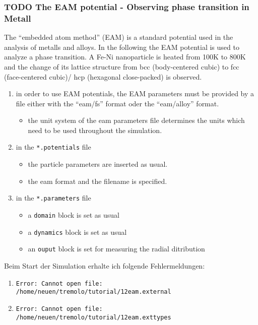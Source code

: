 \documentclass[11pt]{article}
\begin{document}
\subsubsection{\textbf{TODO} The EAM potential - Observing phase transition in Metall}
\label{sec-2.4.12}


The ``embedded atom method'' (EAM) is a standard potential used in the analysis of metalls and alloys. In the following the EAM potential is used to analyze a phase transition. 
A Fe-Ni nanoparticle is heated from 100K to 800K and the change of its lattice structure from bcc (body-centered cubic) to fcc (face-centered cubic)/ hcp (hexagonal close-packed) is observed. 

\begin{enumerate}
\item in order to use EAM potentials, the EAM parameters must be provided by a file either with the ``eam/fs'' format oder the ``eam/alloy'' format.

\begin{itemize}
\item the unit system of the eam parameters file determines the units which need to be used throughout the simulation.
\end{itemize}

\item in the \texttt{*.potentials} file

\begin{itemize}
\item the particle parameters are inserted as usual.
\item the eam format and the filename is specified.
\end{itemize}

\item in the \texttt{*.parameters} file

\begin{itemize}
\item a \texttt{domain} block is set as usual
\item a \texttt{dynamics} block is set as usual
\item an \texttt{ouput} block is set for measuring the radial ditribution
\end{itemize}

\end{enumerate}
Beim Start der Simulation erhalte ich folgende Fehlermeldungen:
\begin{enumerate}
\item \texttt{Error: Cannot open file: /home/neuen/tremolo/tutorial/12eam.external}
\item \texttt{Error: Cannot open file: /home/neuen/tremolo/tutorial/12eam.exttypes}
\end{enumerate}
\end{document}
